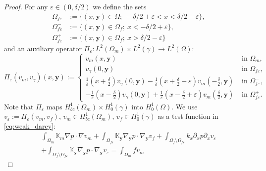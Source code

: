 \documentclass{llncs}
\def\vc#1{\mathbf{\boldsymbol{#1}}}     %
\def\tn#1{{\mathbb{#1}}}    %
\def\ep{\varepsilon}
\def\yy{{\vc y}}
\begin{document}
\begin{proof}
For any $\ep\in(0,\delta/2)$ we define the sets
\begin{align*}
\Omega_{f\ep} &:= \{(x,\vc y)\in\Omega;~-\delta/2+\ep<x<\delta/2-\ep\},\\
\Omega_{f\ep}^- &:= \{(x,\vc y)\in\Omega_f;~x<-\delta/2+\ep\},\\
\Omega_{f\ep}^+ &:= \{(x,\vc y)\in\Omega_f;~x>\delta/2-\ep\}
\end{align*}
and an auxiliary operator $\Pi_\ep:L^2(\Omega_m)\times L^2(\gamma)\to L^2(\Omega)$:
\[ \Pi_\ep(v_m,v_\gamma)(x,\vc y) :=
\begin{cases}
v_m(x,\vc y) & \mbox{ in }\Omega_m,\\
v_\gamma(0,\vc y) & \mbox{ in }\Omega_{f\ep},\\
\frac1\ep(x+\frac\delta2)v_\gamma(0,\vc y) - \frac1\ep(x+\frac\delta2-\ep)v_m(-\frac\delta2,\vc y) & \mbox{ in }\Omega_{f\ep}^-,\\
-\frac1\ep(x-\frac\delta2)v_\gamma(0,\vc y) + \frac1\ep(x-\frac\delta2+\ep)v_m(\frac\delta2,\vc y) & \mbox{ in }\Omega_{f\ep}^+.
\end{cases}
\]
Note that $\Pi_\ep$ maps $H^1_{bc}(\Omega_m)\times H^1_0(\gamma)$ into $H^1_0(\Omega)$.
We use $v_\ep:=\Pi_\ep(v_m,v_f)$, $v_m\in H^1_{bc}(\Omega_m)$, $v_f\in H^1_0(\gamma)$ as a test function in \eqref{eq:weak_darcy}:
\begin{multline}
\label{eq:global_veps}
\int_{\Omega_m}\tn K_m\nabla p\cdot\nabla v_m
+\int_{\Omega_{f\ep}}\tn K_\yy\nabla_\yy p\cdot\nabla_\yy v_f
+\int_{\Omega_f\setminus\Omega_{f\ep}} k_x\partial_x p \partial_x v_\ep\\
+ \int_{\Omega_f\setminus\Omega_{f\ep}} \tn K_\yy\nabla_\yy p \cdot \nabla_\yy v_\ep
= \int_{\Omega_m} f v_m

\end{multline}
\end{proof}
\end{document}
